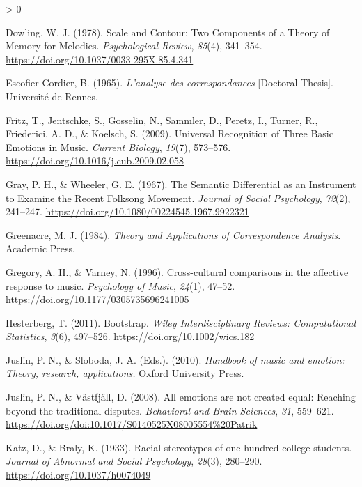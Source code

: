 \documentclass[
  english,
  man,floatsintext]{apa6}
\newlength{\cslhangindent}
\newenvironment{CSLReferences}[2] %
 {%
  \setlength{\parindent}{0pt}
  \ifodd #1 \everypar{\setlength{\hangindent}{\cslhangindent}}\ignorespaces\fi
  \ifnum #2 > 0
  \setlength{\parskip}{#2\baselineskip}
  \fi
 }%
 {}
\begin{document}
\begin{CSLReferences}{1}{0}
\leavevmode\hypertarget{ref-Dowling1978a}{}%
Dowling, W. J. (1978). {Scale and Contour: Two Components of a Theory of Memory for Melodies}. \emph{Psychological Review}, \emph{85}(4), 341--354. \url{https://doi.org/10.1037/0033-295X.85.4.341}

\leavevmode\hypertarget{ref-Escofier-Cordier1965}{}%
Escofier-Cordier, B. (1965). \emph{{L'analyse des correspondances}} {[}Doctoral Thesis{]}. Universit{é} de Rennes.

\leavevmode\hypertarget{ref-Fritz2009}{}%
Fritz, T., Jentschke, S., Gosselin, N., Sammler, D., Peretz, I., Turner, R., Friederici, A. D., \& Koelsch, S. (2009). {Universal Recognition of Three Basic Emotions in Music}. \emph{Current Biology}, \emph{19}(7), 573--576. \url{https://doi.org/10.1016/j.cub.2009.02.058}

\leavevmode\hypertarget{ref-Gray1967}{}%
Gray, P. H., \& Wheeler, G. E. (1967). {The Semantic Differential as an Instrument to Examine the Recent Folksong Movement}. \emph{Journal of Social Psychology}, \emph{72}(2), 241--247. \url{https://doi.org/10.1080/00224545.1967.9922321}

\leavevmode\hypertarget{ref-Greenacre1984}{}%
Greenacre, M. J. (1984). \emph{{Theory and Applications of Correspondence Analysis}}. Academic Press.

\leavevmode\hypertarget{ref-Gregory1996}{}%
Gregory, A. H., \& Varney, N. (1996). {Cross-cultural comparisons in the affective response to music}. \emph{Psychology of Music}, \emph{24}(1), 47--52. \url{https://doi.org/10.1177/0305735696241005}

\leavevmode\hypertarget{ref-Hesterberg2011}{}%
Hesterberg, T. (2011). {Bootstrap}. \emph{Wiley Interdisciplinary Reviews: Computational Statistics}, \emph{3}(6), 497--526. \url{https://doi.org/10.1002/wics.182}

\leavevmode\hypertarget{ref-Juslin2010}{}%
Juslin, P. N., \& Sloboda, J. A. (Eds.). (2010). \emph{{Handbook of music and emotion: Theory, research, applications.}} Oxford University Press.

\leavevmode\hypertarget{ref-Juslin2008a}{}%
Juslin, P. N., \& Västfjäll, D. (2008). {All emotions are not created equal: Reaching beyond the traditional disputes}. \emph{Behavioral and Brain Sciences}, \emph{31}, 559--621. \url{https://doi.org/doi:10.1017/S0140525X08005554\%20Patrik}

\leavevmode\hypertarget{ref-Katz1933}{}%
Katz, D., \& Braly, K. (1933). {Racial stereotypes of one hundred college students}. \emph{Journal of Abnormal and Social Psychology}, \emph{28}(3), 280--290. \url{https://doi.org/10.1037/h0074049}


\end{CSLReferences}
\end{document}
